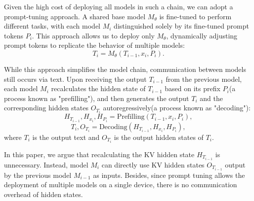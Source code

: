 Given the high cost of deploying all models in such a chain, we can adopt a prompt-tuning approach. A shared base model $M_{\theta}$ is fine-tuned to perform different tasks, with each model $M_i$ distinguished solely by its fine-tuned prompt tokens $P_i$. This approach allows us to deploy only $M_{\theta}$, dynamically adjusting prompt tokens to replicate the behavior of multiple models:
\begin{equation}
T_i = M_{\theta}(T_{i-1}, x_i, P_i).
\end{equation}

While this approach simplifies the model chain, communication between models still occurs via text. Upon receiving the output  $T_{i-1}$ from the previous model, each model $M_i$ recalculates the hidden state of $T_{i-1}$ based on its prefix $P_i$(a process known as "prefilling"), and then generates the output $T_i$ and the corresponding hidden states $O_{T_{i}}$ autoregressively(a process known as "decoding"):
\begin{equation}
H_{T_{i-1}}, H_{x_{i}}, H_{P_{i}} = \text{Prefilling}(T_{i-1}, x_i, P_i),
\end{equation}
\begin{equation}
T_i, O_{T_{i}} = \text{Decoding}(H_{T_{i-1}}, H_{x_{i}}, H_{P_{i}}),
\end{equation}
where $T_i$ is the output text and $O_{T_{i}}$ is the output hidden states of $T_i$.

In this paper, we argue that recalculating the KV hidden state $H_{T_{i-1}}$ is unnecessary. Instead, model $M_i$ can directly use KV hidden states $O_{T_{i-1}}$ output by the previous model $M_{i-1}$ as inputs. Besides, since prompt tuning allows the deployment of multiple models on a single device, there is no communication overhead of hidden states.



